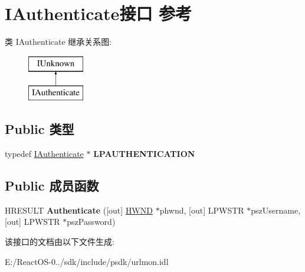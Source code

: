 \hypertarget{interface_i_authenticate}{}\section{I\+Authenticate接口 参考}
\label{interface_i_authenticate}
类 I\+Authenticate 继承关系图\+:\begin{figure}[H]
\begin{center}
\leavevmode
\includegraphics[height=2.000000cm]{interface_i_authenticate}
\end{center}
\end{figure}
\subsection*{Public 类型}
\begin{DoxyCompactItemize}
\item 
\mbox{\label{interface_i_authenticate_a075d137df7108668ef0c56c4a4526e6d}} 
typedef \hyperlink{interface_i_authenticate}{I\+Authenticate} $\ast$ {\bfseries L\+P\+A\+U\+T\+H\+E\+N\+T\+I\+C\+A\+T\+I\+ON}
\end{DoxyCompactItemize}
\subsection*{Public 成员函数}
\begin{DoxyCompactItemize}
\item 
\mbox{\label{interface_i_authenticate_ae7ef0f24bc9e045acd95b2b0d2afdffc}} 
H\+R\+E\+S\+U\+LT {\bfseries Authenticate} (\mbox{[}out\mbox{]} \hyperlink{interfacevoid}{H\+W\+ND} $\ast$phwnd, \mbox{[}out\mbox{]} L\+P\+W\+S\+TR $\ast$psz\+Username, \mbox{[}out\mbox{]} L\+P\+W\+S\+TR $\ast$psz\+Password)
\end{DoxyCompactItemize}


该接口的文档由以下文件生成\+:\begin{DoxyCompactItemize}
\item 
E\+:/\+React\+O\+S-\/0../sdk/include/psdk/urlmon.\+idl\end{DoxyCompactItemize}
